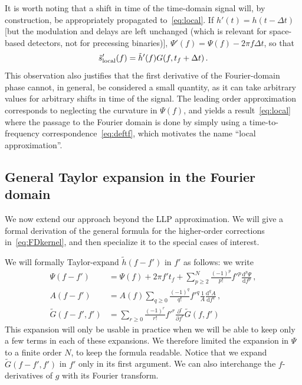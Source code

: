 \documentclass[aps,showpacs,%
prd,superscriptaddress,nofootinbib]{revtex4}
\newcommand{\be}{\begin{equation}}
\newcommand{\ee}{\end{equation}}
\newcommand\ud{{\mathrm{d}}}
\newcommand{\tf}{t_{f}}
\begin{document}
It is worth noting that a shift in time of the time-domain signal will, by construction, be appropriately propagated to~\eqref{eq:local}. If $h'(t) = h(t -  \Delta t)$ [but the modulation and delays are left unchanged (which is relevant for space-based detectors, not for precessing binaries)], $\Psi'(f) = \Psi(f) - 2\pi f \Delta t$, so that
\be\label{eq:localshifted}
	\tilde{s}'_{\rm local}(f) = \tilde{h}'(f) G(f, \tf + \Delta t) \,. 
\ee
This observation also justifies that the first derivative of the Fourier-domain phase cannot, in general, be considered a small quantity, as it can take arbitrary values for arbitrary shifts in time of the signal. The leading order approximation corresponds to neglecting the curvature in $\Psi(f)$, and yields a result~\eqref{eq:local} where the passage to the Fourier domain is done by simply using a time-to-frequency correspondence~\eqref{eq:deftf}, which motivates the name ``local approximation''.


\subsection{General Taylor expansion in the Fourier domain}
\label{subsec:TaylorFD}

We now extend our approach beyond the LLP approximation. We will give a formal derivation of the  general formula for the higher-order corrections in~\eqref{eq:FDkernel}, and then specialize it to the special cases of interest.

We will formally Taylor-expand $\tilde{h}(f-f')$ in $f'$ as follows: we write
\begin{subequations}
\begin{align}
	\Psi(f-f') &= \Psi(f) + 2\pi f' \tf + \sum\limits_{p\geq 2}^{N} \frac{(-1)^{p}}{p!} {f'}^{p} \frac{\ud^{p} \Psi}{\ud f^{p}} \,, \label{eq:expandPsi}\\
	A(f-f') &= A(f) \sum\limits_{q\geq 0} \frac{(-1)^{q}}{q!} {f'}^{q} \frac{1}{A}\frac{\ud^{q} A}{\ud f^{q}} \,, \label{eq:expandA}\\
	\tilde{G}(f-f', f') &= \sum\limits_{r\geq 0} \frac{(-1)^{r}}{r!} {f'}^{r} \frac{\partial^{r} }{\partial f^{r}}  \tilde{G}(f,f') \label{eq:expandg}
\end{align}
\end{subequations}
This expansion will only be usable in practice when we will be able to keep only a few terms in each of these expansions. We therefore limited the expansion in $\Psi$ to a finite order $N$, to keep the formula readable. Notice that we expand $\tilde{G}(f-f',f')$ in $f'$ only in its first argument. We can also interchange the $f$-derivatives of $g$ with its Fourier transform.
\end{document}
